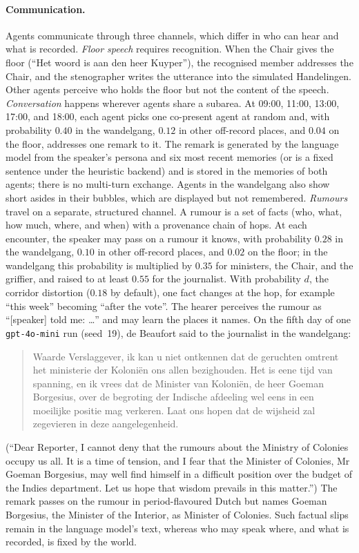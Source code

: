 \documentclass[sigconf,review,anonymous]{acmart}
\begin{document}
\paragraph{Communication.} Agents communicate through three channels,
which differ in who can hear and what is recorded. \emph{Floor speech}
requires recognition. When the Chair gives the floor (``Het woord is aan
den heer Kuyper''), the recognised member addresses the Chair, and the
stenographer writes the utterance into the simulated Handelingen. Other
agents perceive who holds the floor but not the content of the speech.
\emph{Conversation} happens wherever agents share a subarea. At 09:00,
11:00, 13:00, 17:00, and 18:00, each agent picks one co-present agent at
random and, with probability $0.40$ in the wandelgang, $0.12$ in other
off-record places, and $0.04$ on the floor, addresses one remark to it.
The remark is generated by the language model from the speaker's persona
and six most recent memories (or is a fixed sentence under the heuristic
backend) and is stored in the memories of both agents; there is no
multi-turn exchange. Agents in the wandelgang also show short asides in
their bubbles, which are displayed but not remembered. \emph{Rumours}
travel on a separate, structured channel. A rumour is a set of facts (who,
what, how much, where, and when) with a provenance chain of hops. At each
encounter, the speaker may pass on a rumour it knows, with probability
$0.28$ in the wandelgang, $0.10$ in other off-record places, and $0.02$ on
the floor; in the wandelgang this probability is multiplied by $0.35$ for
ministers, the Chair, and the griffier, and raised to at least $0.55$ for
the journalist. With probability $d$, the corridor distortion ($0.18$ by
default), one fact changes at the hop, for example ``this week'' becoming
``after the vote''. The hearer perceives the rumour as ``[speaker] told
me: \ldots'' and may learn the places it names. On the fifth day of one
\texttt{gpt-4o-mini} run (seed~19), de Beaufort said to the journalist in
the wandelgang:
\begin{quote}\small
Waarde Verslaggever, ik kan u niet ontkennen dat de geruchten omtrent het
ministerie der Koloniën ons allen bezighouden. Het is eene tijd van
spanning, en ik vrees dat de Minister van Koloniën, de heer Goeman
Borgesius, over de begroting der Indische afdeeling wel eens in een
moeilijke positie mag verkeren. Laat ons hopen dat de wijsheid zal
zegevieren in deze aangelegenheid.
\end{quote}
(``Dear Reporter, I cannot deny that the rumours about the Ministry of
Colonies occupy us all. It is a time of tension, and I fear that the
Minister of Colonies, Mr Goeman Borgesius, may well find himself in a
difficult position over the budget of the Indies department. Let us hope
that wisdom prevails in this matter.'') The remark passes on the rumour in
period-flavoured Dutch but names Goeman Borgesius, the Minister of the
Interior, as Minister of Colonies. Such factual slips remain in the
language model's text, whereas who may speak where, and what is recorded,
is fixed by the world.
\end{document}

